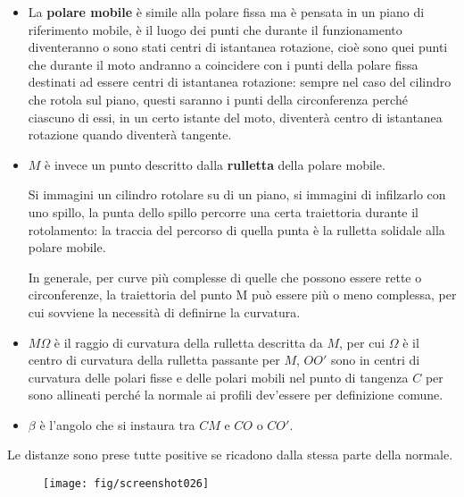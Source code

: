 \documentclass[a4paper, 15pt]{article}
\begin{document}
\begin{adjustwidth}{2in}{}
\begin{itemize}
		\item La \textbf{polare mobile} è simile alla polare fissa ma è pensata in un piano di riferimento mobile, è il luogo dei punti che durante il funzionamento diventeranno o sono stati centri di istantanea rotazione, cioè sono quei punti che durante il moto andranno a coincidere con i punti della polare fissa destinati ad essere centri di istantanea rotazione: sempre nel caso del cilindro che rotola sul piano, questi saranno i punti della circonferenza perché ciascuno di essi, in un certo istante del moto, diventerà centro di istantanea rotazione quando diventerà tangente. 
\newpage		
		\item $M$ è invece un punto descritto dalla \textbf{rulletta} della polare mobile. 
		
		Si immagini un cilindro rotolare su di un piano, si immagini di infilzarlo con uno spillo, la punta dello spillo percorre una certa traiettoria durante il rotolamento: la traccia del percorso di quella punta è la rulletta solidale alla polare mobile.
		
		In generale, per curve più complesse di quelle che possono essere rette o circonferenze, la traiettoria del punto M può essere più o meno complessa, per cui sovviene la necessità di definirne la curvatura.
		
		
		\item $M\Omega$ è il raggio di curvatura della rulletta descritta da $M$, per cui $\Omega$ è il centro di curvatura della rulletta passante per $M$, $O O'$ sono in centri di curvatura delle polari fisse e delle polari mobili nel punto di tangenza $C$ per sono allineati perché la normale ai profili dev'essere per definizione comune.
		
		\item $\beta$ è l'angolo che si instaura tra $CM$ e $CO$ o $CO'$.
	\end{itemize} 
	
		Le distanze sono prese tutte positive se ricadono dalla stessa parte della normale.
		\begin{figure}[H]
			\centering
			\texttt{[image: fig/screenshot026]}
			\label{fig:screenshot026}
		\end{figure}
	\end{adjustwidth}
\end{document}
